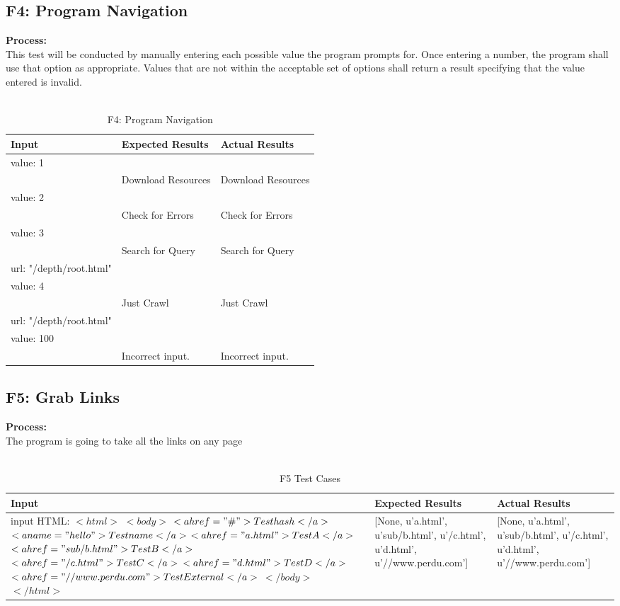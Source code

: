 \documentclass[12pt, titlepage]{article}
\begin{document}
\subsection{F4: Program Navigation}
\textbf{Process:}\\
This test will be conducted by manually entering each possible value the program prompts for. Once entering a number, the program shall use that option as appropriate. Values that are not within the acceptable set of options shall return a result specifying that the value entered is invalid.\\\\
\begin{table}[h!]
\centering
\begin{tabular}{ p{7cm}  p{4cm}  p{4cm} }
	Input &Expected Results &Actual Results\\ \hline
	value: 1 \\
	&Download Resources& Download Resources\\ \hline
	value: 2 \\
	 & Check for Errors & Check for Errors \\ \hline
         value: 3 \\
	 & Search for Query & Search for Query \\ \hline
	url: "/depth/root.html"\\
	value: 4 \\
	 & Just Crawl & Just Crawl \\ \hline
	url: "/depth/root.html"\\
	value: 100 \\
	& Incorrect input. & Incorrect input.\\ \hline
\end{tabular}
\caption{F4: Program Navigation}
\label{table:F4: Program Navigation}
\end{table}

\subsection{F5: Grab Links}
\textbf{Process:}\\
The program is going to take all the links on any page\\\\
\begin{table}[h!]
\centering
\begin{tabular}{ p{7cm}  p{4cm}  p{4cm} }
	Input &Expected Results &Actual Results\\ \hline
        input HTML: 
        ${<html>}$
    	${<body>}$
       ${ <a href="\#">Test hash</a>}$
       ${ <a name="hello">Test name</a>}$
      ${ <a href="a.html">Test A</a>}$
     ${   <a href="sub/b.html">Test B</a>}$
      ${  <a href="/c.html">Test C</a>}$
    ${    <a href="d.html">Test D</a>}$
    ${    <a href="//www.perdu.com">Test External</a>}$
    ${    </body>}$
     ${   </html>}$
	&[None, u'a.html', u'sub/b.html', u'/c.html', u'd.html', u'//www.perdu.com']& [None, u'a.html', u'sub/b.html', u'/c.html', u'd.html', u'//www.perdu.com']\\ \hline
\end{tabular}
\caption{F5 Test Cases}
\label{table:F5 Test Cases}
\end{table}
\end{document}
